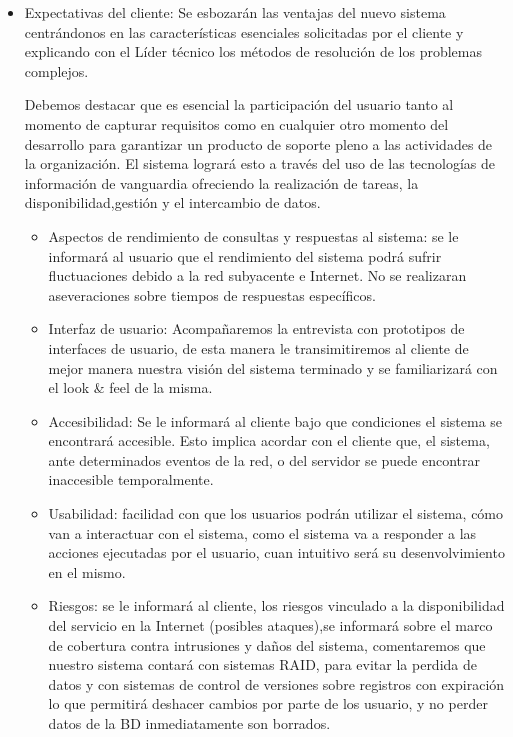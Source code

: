 \begin{itemize}
	\item Expectativas del cliente:	Se esbozarán las ventajas del nuevo sistema centrándonos en las características esenciales solicitadas por el cliente y explicando con el Líder técnico los métodos de resolución de los problemas complejos.
    
	Debemos destacar que es esencial la participación del usuario tanto al momento de capturar requisitos como en cualquier otro momento del desarrollo para garantizar un producto de soporte pleno a las actividades de la organización.
    El sistema logrará esto a través del uso de las tecnologías de información de vanguardia ofreciendo la realización de tareas, la disponibilidad,gestión y el intercambio de datos.
    \begin{itemize}
		\item Aspectos de rendimiento de consultas y respuestas al sistema: se le informará al usuario que el rendimiento del sistema podrá sufrir fluctuaciones debido a la red subyacente e Internet.
No se realizaran aseveraciones sobre tiempos de respuestas específicos.

		\item Interfaz de usuario: Acompañaremos la entrevista con prototipos de interfaces de usuario, de esta manera le transimitiremos al cliente de mejor manera nuestra visión del sistema terminado y se familiarizará con el look \& feel de la misma.

		\item Accesibilidad: Se le informará al cliente bajo que condiciones el sistema se encontrará accesible.
        Esto implica acordar con el cliente que, el sistema, ante determinados eventos de la red, o del servidor se puede encontrar inaccesible temporalmente.
        
        \item Usabilidad: facilidad con que los usuarios podrán utilizar el sistema, cómo van a interactuar con el sistema, como el sistema va a responder a las acciones ejecutadas por el usuario, cuan intuitivo será su desenvolvimiento en el mismo.

		\item Riesgos: se le informará al cliente, los riesgos vinculado a la disponibilidad del servicio en la Internet (posibles ataques),se informará sobre el marco de cobertura contra intrusiones y daños del sistema, comentaremos que nuestro sistema contará con sistemas RAID, para evitar la perdida de datos y con sistemas de control de versiones sobre registros con expiración lo que permitirá deshacer cambios por parte de los usuario, y no perder datos de la BD inmediatamente son borrados.
	\end{itemize}


\end{itemize}
